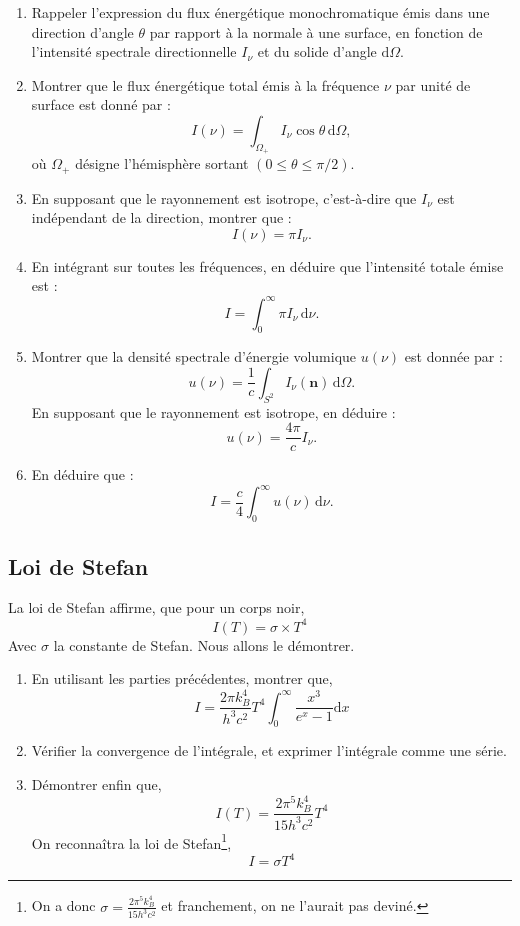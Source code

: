 \documentclass[a4paper,10pt]{report}
\begin{document}
\begin{enumerate}
	\item Rappeler l’expression du flux énergétique monochromatique émis dans une direction d’angle $\theta$ par rapport à la normale à une surface, en fonction de l’intensité spectrale directionnelle $I_\nu$ et du solide d’angle $\text{d}\Omega$.
	
	\item Montrer que le flux énergétique total émis à la fréquence $\nu$ par unité de surface est donné par :
	\[
	I(\nu) = \int_{\Omega_+} I_\nu \cos\theta \, \text{d}\Omega,
	\]
	où $\Omega_+$ désigne l’hémisphère sortant $(0 \leq \theta \leq \pi/2)$.
	
	\item En supposant que le rayonnement est isotrope, c’est-à-dire que $I_\nu$ est indépendant de la direction, montrer que :
	\[
	I(\nu) = \pi I_\nu.
	\]
	
	\item En intégrant sur toutes les fréquences, en déduire que l’intensité totale émise est :
	\[
	I = \int_0^\infty \pi I_\nu \, \text{d}\nu.
	\]
	
	\item Montrer que la densité spectrale d’énergie volumique $u(\nu)$ est donnée par :
	\[
	u(\nu) = \frac{1}{c} \int_{S^2} I_\nu(\textbf{n}) \, \text{d}\Omega.
	\]
	En supposant que le rayonnement est isotrope, en déduire :
	\[
	u(\nu) = \frac{4\pi}{c} I_\nu.
	\]
	
	\item En déduire que :
	\[
	I = \frac{c}{4} \int_0^\infty u(\nu)\, \text{d}\nu.
	\]
\end{enumerate}

	\subsection{Loi de Stefan}
	La loi de Stefan affirme, que pour un corps noir,
	$$I(T) = \sigma\times T^4$$
	Avec $\sigma$ la constante de Stefan.
Nous allons le démontrer.
\begin{enumerate}
	\item En utilisant les parties précédentes, montrer que,
	$$I = \frac{2\pi k_B^4}{h^3c^2}T^4\int_0^\infty \frac {x^3}{e^x-1}\text{d}x$$
	\item Vérifier la convergence de l'intégrale, et exprimer l'intégrale comme une série.
	\item Démontrer enfin que,
	$$I(T) = \frac{2\pi^5 k_B^4}{15h^3c^2} T^4$$
On reconnaîtra la loi de Stefan\footnote{On a donc $\sigma = \frac{2\pi^5 k_B^4}{15h^3c^2}$ et franchement, on ne l'aurait pas deviné.},
$$I = \sigma T^4$$
\end{enumerate}
\end{document}
